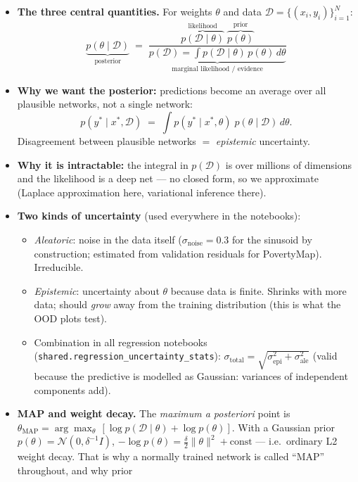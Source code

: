 \documentclass[10pt,a4paper]{article}
\newcommand{\code}[1]{\texttt{#1}}
\newcommand{\map}{\mathrm{MAP}}
\begin{document}
\begin{itemize}
\item \textbf{The three central quantities.} For weights $\theta$ and data
  $\mathcal{D}=\{(x_i,y_i)\}_{i=1}^N$:
  \[
  \underbrace{p(\theta\mid\mathcal{D})}_{\text{posterior}}
  \;=\;
  \frac{\overbrace{p(\mathcal{D}\mid\theta)}^{\text{likelihood}}\;
        \overbrace{p(\theta)}^{\text{prior}}}
       {\underbrace{p(\mathcal{D})=\int p(\mathcal{D}\mid\theta)\,p(\theta)\,d\theta}_{\text{marginal likelihood / evidence}}}
  \]
\item \textbf{Why we want the posterior:} predictions become an average over all plausible
  networks, not a single network:
  \[
  p(y^*\mid x^*,\mathcal{D}) \;=\; \int p(y^*\mid x^*,\theta)\; p(\theta\mid\mathcal{D})\, d\theta .
  \]
  Disagreement between plausible networks $=$ \emph{epistemic} uncertainty.
\item \textbf{Why it is intractable:} the integral in $p(\mathcal{D})$ is over millions of
  dimensions and the likelihood is a deep net --- no closed form, so we approximate
  (Laplace approximation here, variational inference there).
\item \textbf{Two kinds of uncertainty} (used everywhere in the notebooks):
  \begin{itemize}
  \item \emph{Aleatoric}: noise in the data itself ($\sigma_{\text{noise}}=0.3$ for the sinusoid by
    construction; estimated from validation residuals for PovertyMap). Irreducible.
  \item \emph{Epistemic}: uncertainty about $\theta$ because data is finite. Shrinks with more
    data; should \emph{grow} away from the training distribution (this is what the OOD plots test).
  \item Combination in all regression notebooks (\code{shared.regression\_uncertainty\_stats}):
    $\sigma_{\text{total}}=\sqrt{\sigma_{\text{epi}}^2+\sigma_{\text{ale}}^2}$
    (valid because the predictive is modelled as Gaussian: variances of independent components add).
  \end{itemize}
\item \textbf{MAP and weight decay.} The \emph{maximum a posteriori} point is
  $\theta_\map=\arg\max_\theta\,[\log p(\mathcal{D}\mid\theta)+\log p(\theta)]$.
  With a Gaussian prior $p(\theta)=\mathcal{N}(0,\delta^{-1}I)$,
  $-\log p(\theta)=\tfrac{\delta}{2}\lVert\theta\rVert^2+\text{const}$ --- i.e.\ ordinary L2 weight
  decay. That is why a normally trained network is called ``MAP'' throughout, and why prior

\end{itemize}
\end{document}
